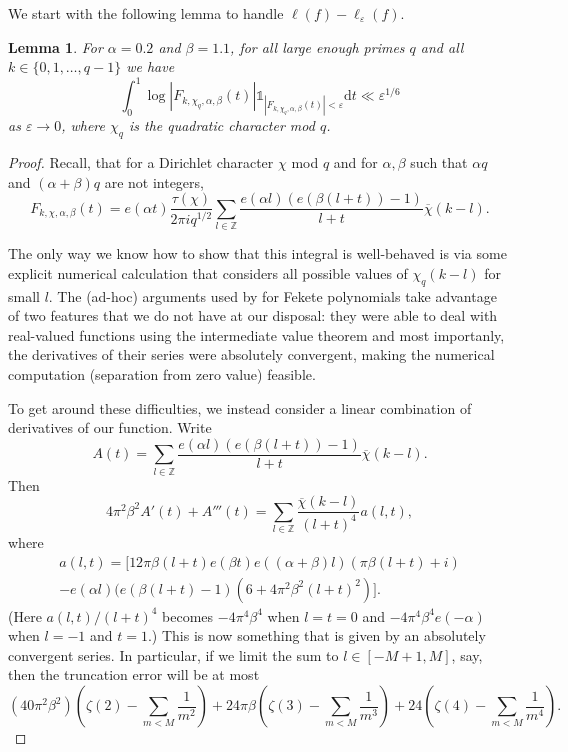 \documentclass[12pt, a4paper]{amsart}
\newtheorem{lemma}{Lemma}
\theoremstyle{remark}
\newcommand{\Z}{\ensuremath{\mathbb{Z}}}
\newcommand{\ud}{\mathrm{d}}
\newcommand{\abs}[1]{\left|#1\right|}
\newcommand{\chibar}{\overline \chi}
\begin{document}
We start with the following lemma to handle $\ell(f) - \ell_{\varepsilon}(f)$. 
\begin{lemma}\label{lemmaLogSmall}
    For $\alpha=0.2$ and $\beta = 1.1$, for all large enough primes $q$ and all
    $k \in \{0, 1, \ldots, q-1\}$ we have
\[
    \int_0^1 \log \abs{F_{k,\chi_q,\alpha,\beta}(t)}\mathds{1}_{\abs{F_{k,\chi_q,\alpha,\beta}(t)}
        < \varepsilon} \ud t \ll \varepsilon^{1/6}
\]
    as $\varepsilon \rightarrow 0$, where $\chi_q$ is the quadratic character mod $q$.
\end{lemma}
\begin{proof}
     Recall, that for a Dirichlet character $\chi$ mod $q$ and for $\alpha,\beta$
    such that $\alpha q$ and $(\alpha + \beta)q$ are not integers,
\begin{equation}\nonumber
    F_{k,\chi,\alpha,\beta}(t)
        = e(\alpha t)\frac{\tau(\chi)}{2\pi i q^{1/2}}\sum_{l \in \Z}
    \frac{e(\alpha l) (e(\beta(l + t)) - 1)}
    {l + t}
    \chibar(k-l).
\end{equation}


The only way we know how to show that this integral is well-behaved is via some
explicit numerical calculation that considers all possible values of $\chi_q(k
- l)$ for small $l$. The (ad-hoc) arguments used by \cite{KLM-fekete} for Fekete polynomials take advantage of two features
that we do not have at our disposal: they were able to deal with real-valued
functions using  the intermediate value theorem and most importanly, the derivatives of their series were absolutely convergent,
making the numerical computation (separation from zero value) feasible.

To get around these difficulties, we instead consider a linear combination
of derivatives of our function. Write
\[
    A(t) =
    \sum_{l \in \Z}
    \frac{e(\alpha l) (e(\beta(l + t)) - 1)}
    {l + t }
    \chibar(k-l).
\]
Then
\[
    4\pi^2\beta^2 A'(t) + A'''(t) =
    \sum_{l \in \Z} \frac{\chibar(k-l)}{(l+t)^4} a(l,t),
\]
where
\begin{multline*}
    a(l,t) = 
    \bigg[ 12 \pi \beta(l + t)e(\beta t)  e((\alpha + \beta)l) \left(\pi \beta (l+t) + i\right)
        \\
    - e(\alpha l)(e(\beta(l+t)-1)\left(6 + 4\pi^2\beta^2(l+t)^2\right) \bigg].
\end{multline*}
(Here $a(l,t)/(l + t)^4$ becomes $-4 \pi^4 \beta^4$ when $l = t = 0$
and $-4\pi^4\beta^4e(-\alpha)$ when $l=-1$ and $t = 1$.)
This is now something that is given by an absolutely convergent series.
In particular, if we limit the sum to $l \in [-M+1, M]$, say, then the
truncation error will be at most
\[
\left(40 \pi^2 \beta^2 \right)\left(\zeta(2)
- \sum_{m < M}\frac{1}{m^2}\right)
+ 24 \pi \beta \left(\zeta(3) - \sum_{m < M}\frac{1}{m^3}\right)
+ 24 \left(\zeta(4) - \sum_{m < M}\frac{1}{m^4}\right).
\]


\end{proof}
\end{document}
